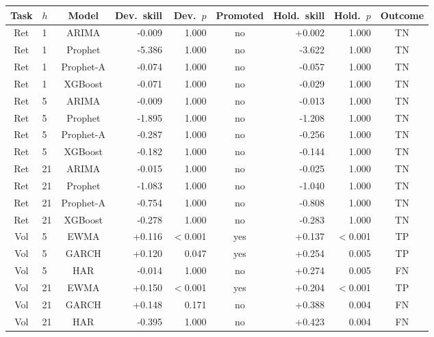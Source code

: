 \begin{tabular}{clcrrcrrc}
\toprule
Task & $h$ & Model & Dev.\ skill & Dev.\ $p$ & Promoted & Hold.\ skill & Hold.\ $p$ & Outcome \\
\midrule
Ret & 1 & ARIMA & -0.009 & 1.000 & no & +0.002 & 1.000 & TN \\
Ret & 1 & Prophet & -5.386 & 1.000 & no & -3.622 & 1.000 & TN \\
Ret & 1 & Prophet-A & -0.074 & 1.000 & no & -0.057 & 1.000 & TN \\
Ret & 1 & XGBoost & -0.071 & 1.000 & no & -0.029 & 1.000 & TN \\
Ret & 5 & ARIMA & -0.009 & 1.000 & no & -0.013 & 1.000 & TN \\
Ret & 5 & Prophet & -1.895 & 1.000 & no & -1.208 & 1.000 & TN \\
Ret & 5 & Prophet-A & -0.287 & 1.000 & no & -0.256 & 1.000 & TN \\
Ret & 5 & XGBoost & -0.182 & 1.000 & no & -0.144 & 1.000 & TN \\
Ret & 21 & ARIMA & -0.015 & 1.000 & no & -0.025 & 1.000 & TN \\
Ret & 21 & Prophet & -1.083 & 1.000 & no & -1.040 & 1.000 & TN \\
Ret & 21 & Prophet-A & -0.754 & 1.000 & no & -0.808 & 1.000 & TN \\
Ret & 21 & XGBoost & -0.278 & 1.000 & no & -0.283 & 1.000 & TN \\
Vol & 5 & EWMA & +0.116 & $<$0.001 & yes & +0.137 & $<$0.001 & TP \\
Vol & 5 & GARCH & +0.120 & 0.047 & yes & +0.254 & 0.005 & TP \\
Vol & 5 & HAR & -0.014 & 1.000 & no & +0.274 & 0.005 & FN \\
Vol & 21 & EWMA & +0.150 & $<$0.001 & yes & +0.204 & $<$0.001 & TP \\
Vol & 21 & GARCH & +0.148 & 0.171 & no & +0.388 & 0.004 & FN \\
Vol & 21 & HAR & -0.395 & 1.000 & no & +0.423 & 0.004 & FN \\
\bottomrule
\end{tabular}
